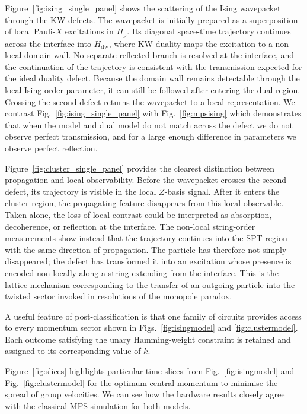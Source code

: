 \documentclass[aps,floatfix,10pt,amssymb,amsfont,amsmath,superscriptaddress,float,nofootinbib,longbibliography,nobalancelastpage,twocolumn]{revtex4-2}
\begin{document}
Figure~\ref{fig:ising_single_panel} shows the scattering of the Ising wavepacket through the KW defects. The wavepacket is initially prepared as a superposition of local Pauli-$X$ excitations in $H_\mathrm{p}$. Its diagonal space-time trajectory continues across the interface into $H_\mathrm{dw}$, where KW duality maps the excitation to a non-local domain wall. No separate reflected branch is resolved at the interface, and the continuation of the trajectory is consistent with the transmission expected for the ideal duality defect. Because the domain wall remains detectable through the local Ising order parameter, it can still be followed after entering the dual region. Crossing the second defect returns the wavepacket to a local representation. We contrast Fig.~\ref{fig:ising_single_panel} with Fig.~\ref{fig:mpsising} which demonstrates that when the model and dual model do not match across the defect we do not observe perfect transmission, and for a large enough difference in parameters we observe perfect reflection.

Figure~\ref{fig:cluster_single_panel} provides the clearest distinction between propagation and local observability. Before the wavepacket crosses the second defect, its trajectory is visible in the local $Z$-basis signal. After it enters the cluster region, the propagating feature disappears from this local observable. Taken alone, the loss of local contrast could be interpreted as absorption, decoherence, or reflection at the interface. The non-local string-order measurements show instead that the trajectory continues into the SPT region with the same direction of propagation. The particle has therefore not simply disappeared; the defect has transformed it into an excitation whose presence is encoded non-locally along a string extending from the interface. This is the lattice mechanism corresponding to the transfer of an outgoing particle into the twisted sector invoked in resolutions of the monopole paradox.

A useful feature of post-classification is that one family of circuits provides access to every momentum sector shown in Figs.~\ref{fig:isingmodel} and \ref{fig:clustermodel}. Each outcome satisfying the unary Hamming-weight constraint is retained and assigned to its corresponding value of $k$. 

Figure~\ref{fig:slices} highlights particular time slices from Fig.~\ref{fig:isingmodel} and Fig.~\ref{fig:clustermodel} for the optimum central momentum to minimise the spread of group velocities. We can see how the hardware results closely agree with the classical MPS simulation for both models.
\end{document}
